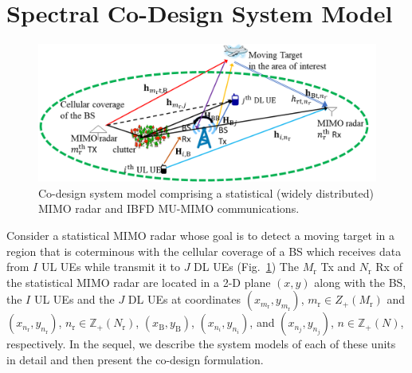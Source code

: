 \documentclass[9pt,journal]{IEEEtran}
\theoremstyle{definition}
\begin{document}
\section{Spectral Co-Design System Model}
\label{sec:system}
 \begin{figure}[t]
	\centering
	\includegraphics[width=1\columnwidth]{setup_model_tsp.png}
	\caption{Co-design system model comprising a statistical (widely distributed) MIMO radar and IBFD MU-MIMO communications.}
	\label{fig:setup}
	\vspace{-1em}
\end{figure}
Consider a statistical MIMO radar whose goal is to detect a moving target in a region that is coterminous with the cellular coverage of a BS which receives data from $\mathit{I}$ UL UEs while transmit it to $\mathit{J}$ DL UEs (Fig.~\ref{fig:setup}) %
The $M_\mathrm{r}$ Tx and $N_\mathrm{r}$ Rx of the statistical MIMO radar are located in a 2-D plane $\left(x,y \right)$ along with the BS, the $I$ UL UEs and the $J$ DL UEs at coordinates $\left(x_{m_\mathrm{r}},y_{m_\mathrm{r}}\right)$, $m_\mathrm{r}\in{Z}_{+}(M_\mathrm{r})$ and $\left(x_{n_\mathrm{r}},y_{n_\mathrm{r}} \right)$, $n_\mathrm{r}\in\mathbb{Z}_{+}(N_\mathrm{r})$, $(x_{\mathrm{B}},y_{\mathrm{B}})$, $(x_{n_i},y_{n_i})$, and $(x_{n_j},y_{n_j})$, $n\in\mathbb{Z}_{+}(N)$, respectively. In the sequel, we describe the system models of each of these units in detail and then present the co-design formulation.
\vspace{-1em}
\end{document}
